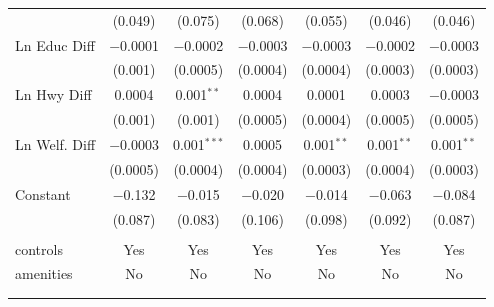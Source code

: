 \begin{table}[!htbp]
\begin{tabular}{@{\extracolsep{5pt}}lcccccc}
  & (0.049) & (0.075) & (0.068) & (0.055) & (0.046) & (0.046) \\ 
  Ln Educ Diff & $-$0.0001 & $-$0.0002 & $-$0.0003 & $-$0.0003 & $-$0.0002 & $-$0.0003 \\ 
  & (0.001) & (0.0005) & (0.0004) & (0.0004) & (0.0003) & (0.0003) \\ 
  Ln Hwy Diff & 0.0004 & 0.001$^{**}$ & 0.0004 & 0.0001 & 0.0003 & $-$0.0003 \\ 
  & (0.001) & (0.001) & (0.0005) & (0.0004) & (0.0005) & (0.0005) \\ 
  Ln Welf. Diff & $-$0.0003 & 0.001$^{***}$ & 0.0005 & 0.001$^{**}$ & 0.001$^{**}$ & 0.001$^{**}$ \\ 
  & (0.0005) & (0.0004) & (0.0004) & (0.0003) & (0.0004) & (0.0003) \\ 
  Constant & $-$0.132 & $-$0.015 & $-$0.020 & $-$0.014 & $-$0.063 & $-$0.084 \\ 
  & (0.087) & (0.083) & (0.106) & (0.098) & (0.092) & (0.087) \\ 
 \hline \\[-1.8ex] 
controls & Yes & Yes & Yes & Yes & Yes & Yes \\ 
amenities & No & No & No & No & No & No \\ 
\hline \\[-1.8ex] 
\hline 
\hline \\[-1.8ex] 
\end{tabular} 
\end{table} 
